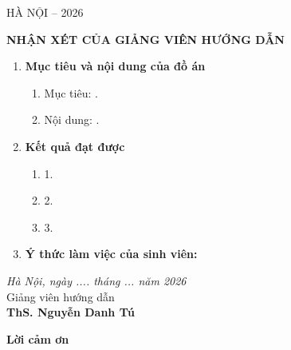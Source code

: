\documentclass[oneside, a4paper]{book}
\theoremstyle{plain}
\theoremstyle{definition}
\theoremstyle{remark}
\renewcommand{\LARGE}{\fontsize{15pt}{15pt}\selectfont}
\begin{document}
\begin{center}
    \LARGE HÀ NỘI -- 2026
\end{center}
    
\restoregeometry

\newpage
{} %
\setcounter{page}{1}
\pagestyle{plain} %

\thisfancypage{
    \setlength{\fboxsep}{0.5cm}
    \fbox}{}

\fontsize{13pt}{16pt}\selectfont
\bigbreak
\begin{center}
    {\bfseries NHẬN XÉT CỦA GIẢNG VIÊN HƯỚNG DẪN}
\end{center}
\bigbreak

\fontsize{12pt}{14pt}\selectfont
\begin{enumerate}
    \item [{\bfseries 1.}]{\bfseries Mục tiêu và nội dung của đồ án}
    \begin{enumerate}
        \item Mục tiêu: .
        \item Nội dung: . 
    \end{enumerate}
    \item [{\bfseries 2.}] {\bfseries Kết quả đạt được} 
    \begin{enumerate}
        \item 1. 
        \item 2.
        \item 3.
    \end{enumerate}
    \item [{\bfseries 3.}]{\bfseries Ý thức làm việc của sinh viên:}
\end{enumerate}
\hspace{0.5\textwidth}
\begin{minipage}{0.5\textwidth}
    \noindent\begin{center}
        \textit{Hà Nội, ngày ....    tháng ... năm 2026} \\
        Giảng viên hướng dẫn\\ \vspace{2cm}
        \textbf{ThS. Nguyễn Danh Tú}
    \end{center}   
\end{minipage}

\newpage
\fontsize{22pt}{16pt}\selectfont
{\bfseries Lời cảm ơn}
\fontsize{13pt}{16pt}\selectfont
\bigskip
\end{document}

